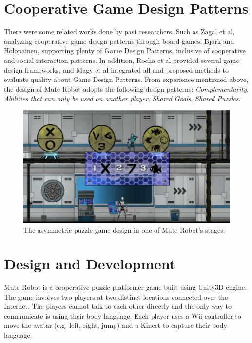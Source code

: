 \documentclass{chi-ext}
\begin{document}
\section{Cooperative Game Design Patterns}
There were some related works done by past researchers. Such as Zagal et al, analyzing cooperative game design patterns through board games\cite{CGDP1}; Bjork and Holopainen\cite{CGDP2}, supporting plenty of Game Design Patterns, inclusive of cooperative and social interaction patterns. In addition, Rocha et al\cite{CGDP3} provided several game design frameworks, and Magy et al\cite{CGDP4} integrated all and proposed methods to evaluate quality about Game Design Patterns. From experience mentioned above, the design of Mute Robot adopts the following design patterns: \textsl{Complementarity}, \textsl{Abilities that can only be used on another player}, \textsl{Shared Goals}, \textsl{Shared Puzzles}. 
 

 \begin{figure}
  \centering
  \includegraphics[width=\linewidth]{figures/Figure1.jpg}
  \caption{The asymmetric puzzle game design in one of Mute Robot's stages.}
  \label{fig:Figure1}
\end{figure}

  
\section{Design and Development}
Mute Robot is a cooperative puzzle platformer game built using Unity3D\cite{Unity3D} engine. 
The game involves two players at two distinct locations connected over the Internet. 
The players cannot talk to each other directly and the only way to communicate is using their body language. 
Each player uses a Wii\cite{Wii} controller to move the avatar (e.g. left, right, jump) and a Kinect to capture their body language. 
\end{document}
